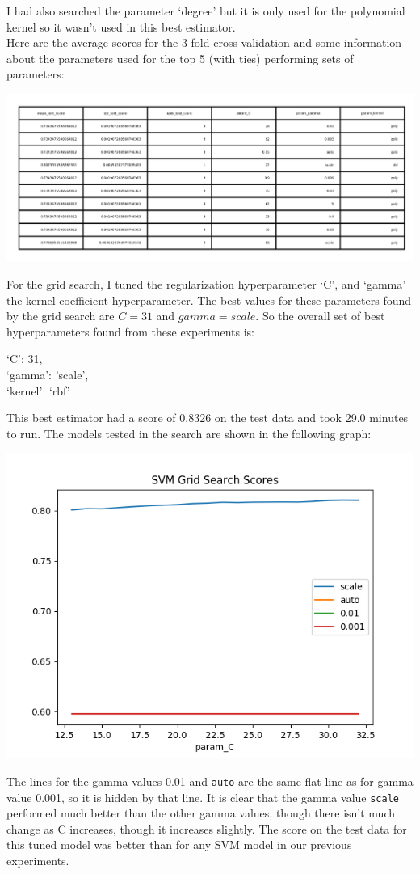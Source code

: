 \documentclass{article}
\begin{document}
I had also searched the parameter `degree' but it is only used for the polynomial kernel so it wasn't used in this best estimator.
\\Here are the average scores for the 3-fold cross-validation and some information about the parameters used for the top 5 (with ties) performing sets of parameters: 
\begin{center}
\includegraphics[scale=1.2]{SVMRandomSearchTable.png}
\end{center}
For the grid search, I tuned the regularization hyperparameter `C', and `gamma' the kernel coefficient hyperparameter. The best values for these parameters found by the grid search are $C=31$ and $gamma=scale$.
So the overall set of best hyperparameters found from these experiments is:
\begin{center}
`C': 31, 
\\`gamma': 'scale', 
\\`kernel': `rbf'
\end{center}
 This best estimator had a score of 0.8326 on the test data and took 29.0 minutes to run. The models tested in the search are shown in the following graph:
 \begin{center}
 	\includegraphics[scale=.7]{SVMGridSearch.png}
 \end{center}
 The lines for the gamma values 0.01 and \texttt{auto} are the same flat line as for gamma value 0.001, so it is hidden by that line. It is clear that the gamma value \texttt{scale} performed much better than the other gamma values, though there isn't much change as C increases, though it increases slightly.
The score on the test data for this tuned model was better than for any SVM model in our previous experiments.
\end{document}
